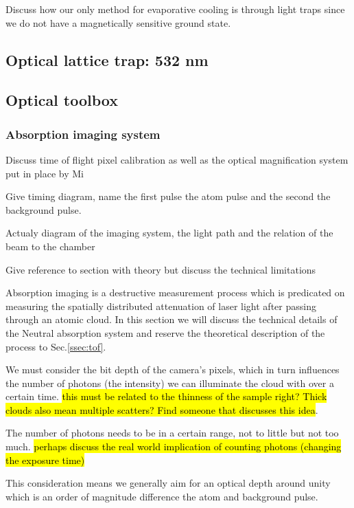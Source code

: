 Discuss how our only method for evaporative cooling is through light traps since we do not have a magnetically sensitive ground state.

\subsection{Optical lattice trap: 532 nm} \label{ssec:532sys}

\subsection{Optical toolbox}
\label{ssec:op_tools}

\subsubsection{Absorption imaging system}

Discuss time of flight pixel calibration as well as the optical magnification system put in place by Mi

Give timing diagram, name the first pulse the atom pulse and the second the background pulse.

Actualy diagram of the imaging system, the light path and the relation of the beam to the chamber

Give reference to section with theory but discuss the technical limitations
 
Absorption imaging is a destructive measurement process which is predicated on measuring the spatially distributed attenuation of laser light after passing through an atomic cloud. In this section we will discuss the technical details of the Neutral absorption system and reserve the theoretical description of the process to Sec.\ref{ssec:tof}. 

We must consider the bit depth of the camera's pixels, which in turn influences the number of photons (the intensity) we can illuminate the cloud with over a certain time. \hl{this must be related to the thinness of the sample right? Thick clouds also mean multiple scatters? Find someone that discusses this idea}.
 
The number of photons needs to be in a certain range, not to little but not too much. \hl{perhaps discuss the real world implication of counting photons (changing the exposure time)} 

This consideration means we generally aim for an optical depth around unity which is an order of magnitude difference the atom and background pulse. 

